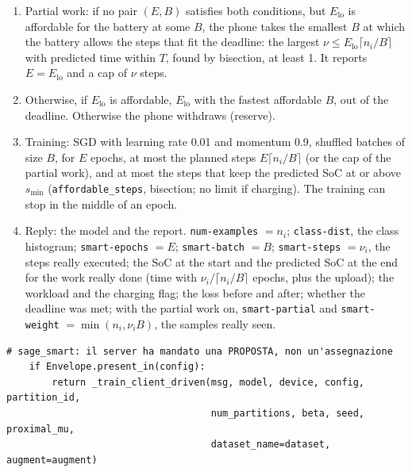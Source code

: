 \documentclass[11pt,a4paper]{article}
\newcommand{\cf}[1]{\texttt{#1}}
\begin{document}
\begin{enumerate}
        charging phone keeps its SoC.
  \item Partial work: if no pair $(E, B)$ satisfies both conditions, but
        $E_{\mathrm{lo}}$ is affordable for the battery at some $B$,
        the phone takes the smallest $B$ at which the battery allows the steps
        that fit the deadline: the largest $\nu \le E_{\mathrm{lo}} \lceil
        n_i / B \rceil$ with predicted time within $T$, found by bisection, at
        least 1. It reports $E = E_{\mathrm{lo}}$ and a cap of $\nu$ steps.
  \item Otherwise, if $E_{\mathrm{lo}}$ is affordable, $E_{\mathrm{lo}}$ with
        the fastest affordable $B$, out of the deadline. Otherwise the phone
        withdraws (reserve).
  \item Training: SGD with learning rate 0.01 and momentum 0.9, shuffled
        batches of size $B$, for $E$ epochs, at most the planned steps $E
        \lceil n_i/B \rceil$ (or the cap of the partial work), and at most the
        steps that keep the predicted SoC at or above $s_{\min}$
        (\cf{affordable\_steps}, bisection; no limit if charging). The
        training can stop in the middle of an epoch.
  \item Reply: the model and the report. \cf{num-examples} $= n_i$;
        \cf{class-dist}, the class histogram; \cf{smart-epochs} $= E$;
        \cf{smart-batch} $= B$; \cf{smart-steps} $= \nu_i$, the steps really
        executed; the SoC at the start and the predicted SoC at the end for
        the work really done (time with $\nu_i / \lceil n_i/B \rceil$ epochs,
        plus the upload); the workload and the charging flag; the loss before
        and after; whether the deadline was met; with the partial work on,
        \cf{smart-partial} and \cf{smart-weight} $= \min(n_i, \nu_i B)$, the
        samples really seen.
\end{enumerate}

\begin{lstlisting}[style=py,firstnumber=68,caption={\texttt{tesifl/tesiFL/client\_app.py}, lines 68--72}]
    # sage_smart: il server ha mandato una PROPOSTA, non un'assegnazione
    if Envelope.present_in(config):
        return _train_client_driven(msg, model, device, config, partition_id,
                                    num_partitions, beta, seed, proximal_mu,
                                    dataset_name=dataset, augment=augment)
\end{lstlisting}
\end{document}
